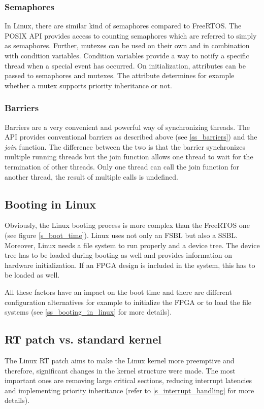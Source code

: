 \subsubsection{Semaphores}
In Linux, there are similar kind of semaphores compared to FreeRTOS.
The \ac{POSIX} \ac{API} provides access to counting semaphores which are referred to simply as semaphores.
Further, mutexes can be used on their own and in combination with condition variables.
Condition variables provide a way to notify a specific thread when a special event has occurred. 
On initialization, attributes can be passed to semaphores and mutexes.
The attribute determines for example whether a mutex supports priority inheritance or not.
\subsubsection{Barriers}
Barriers are a very convenient and powerful way of synchronizing threads. 
The \ac{API} provides conventional barriers as described above (see \ref{ss_barriers}) and the \textit{join} function.
The difference between the two is that the barrier synchronizes multiple running threads but the join function allows one thread to wait for the termination of other threads.
Only one thread can call the join function for another thread, the result of multiple calls is undefined.

\subsection{Booting in Linux}
Obviously, the Linux booting process is more complex than the FreeRTOS one (see figure \ref{s_boot_time}). 
Linux uses not only an \ac{FSBL} but also a \ac{SSBL}.
Moreover, Linux needs a file system to run properly and a device tree.
The device tree has to be loaded during booting as well and provides information on hardware initialization.
If an \ac{FPGA} design is included in the system, this has to be loaded as well.
\par
All these factors have an impact on the boot time and there are different configuration alternatives for example to initialize the \ac{FPGA} or to load the file systems (see \ref{ss_booting_in_linux} for more details). 

\subsection{RT patch vs. standard kernel}
The Linux RT patch aims to make the Linux kernel more preemptive and therefore, significant changes in the kernel structure were made.
The most important ones are removing large critical sections, reducing interrupt latencies and implementing priority inheritance (refer to \ref{s_interrupt_handling} for more details).

